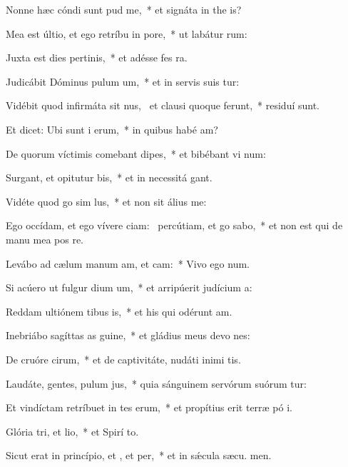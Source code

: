 \item Nonne hæc cóndi sunt pud me,~* et signáta in the is?
\item Mea est últio, et ego retríbu in pore,~* ut labátur  rum:
\item Juxta est dies pertinis,~* et adésse fes ra.
\item Judicábit Dóminus pulum um,~* et in servis suis tur:
\item Vidébit quod infirmáta sit nus,~\pscross{} et clausi quoque ferunt,~* residuí  sunt.
\item Et dicet: Ubi sunt i erum,~* in quibus habé am?
\item De quorum víctimis comebant dipes,~* et bibébant vi num:
\item Surgant, et opitutur bis,~* et in necessitá  gant.
\item Vidéte quod go sim lus,~* et non sit álius   me:
\item Ego occídam, et ego vívere ciam:~\pscross{} percútiam, et go sabo,~* et non est qui de manu mea pos re.
\item Levábo ad cælum manum am, et cam:~* Vivo ego  num.
\item Si acúero ut fulgur dium um,~* et arripúerit judícium  a:
\item Reddam ultiónem tibus is,~* et his qui odérunt  am.
\item Inebriábo sagíttas as guine,~* et gládius meus devo nes:
\item De cruóre cirum,~* et de captivitáte, nudáti inimi tis.
\item Laudáte, gentes, pulum jus,~* quia sánguinem servórum suórum tur:
\item Et vindíctam retríbuet in tes erum,~* et propítius erit terræ pó i.
\item \singlecolsep
\item Glória tri, et lio,~* et Spirí to.
\item Sicut erat in princípio, et , et per,~* et in sǽcula sæcu. men.
